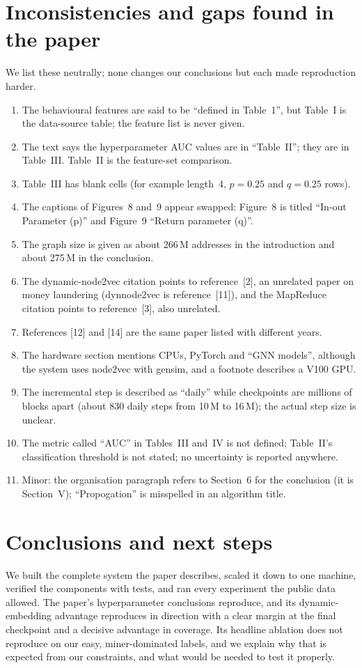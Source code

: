\documentclass[11pt,a4paper]{article}
\begin{document}
\section{Inconsistencies and gaps found in the paper}
We list these neutrally; none changes our conclusions but each made reproduction harder.
\begin{enumerate}
\item The behavioural features are said to be ``defined in Table~1'', but Table~I is the data-source table; the feature list is never given.
\item The text says the hyperparameter AUC values are in ``Table~II''; they are in Table~III. Table~II is the feature-set comparison.
\item Table~III has blank cells (for example length~4, $p=0.25$ and $q=0.25$ rows).
\item The captions of Figures~8 and~9 appear swapped: Figure~8 is titled ``In-out Parameter (p)'' and Figure~9 ``Return parameter (q)''.
\item The graph size is given as about 266\,M addresses in the introduction and about 275\,M in the conclusion.
\item The dynamic-node2vec citation points to reference~[2], an unrelated paper on money laundering (dynnode2vec is reference~[11]), and the MapReduce citation points to reference~[3], also unrelated.
\item References [12] and [14] are the same paper listed with different years.
\item The hardware section mentions CPUs, PyTorch and ``GNN models'', although the system uses node2vec with gensim, and a footnote describes a V100 GPU.
\item The incremental step is described as ``daily'' while checkpoints are millions of blocks apart (about 830 daily steps from 10\,M to 16\,M); the actual step size is unclear.
\item The metric called ``AUC'' in Tables~III and~IV is not defined; Table~II's classification threshold is not stated; no uncertainty is reported anywhere.
\item Minor: the organisation paragraph refers to Section~6 for the conclusion (it is Section~V); ``Propogation'' is misspelled in an algorithm title.
\end{enumerate}

\section{Conclusions and next steps}
We built the complete system the paper describes, scaled it down to one machine, verified the components with tests, and ran every experiment the public data allowed. The paper's hyperparameter conclusions reproduce, and its dynamic-embedding advantage reproduces in direction with a clear margin at the final checkpoint and a decisive advantage in coverage. Its headline ablation does not reproduce on our easy, miner-dominated labels, and we explain why that is expected from our constraints, and what would be needed to test it properly.
\end{document}
